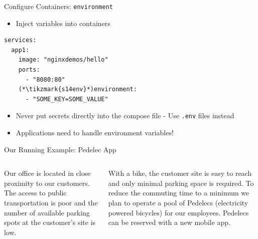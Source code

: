 \begin{frame}[fragile]{Configure Containers: \texttt{environment}}
  \begin{itemize}\item Inject variables into containers\end{itemize}
  \begin{yamlbox}
\begin{lstlisting}[style=wsyamlstyle]
services:
  app1:
    image: "nginxdemos/hello"
    ports:
      - "8080:80"
    (*\tikzmark{s14env}*)environment:
      - "SOME_KEY=SOME_VALUE"
\end{lstlisting}
  \end{yamlbox}
  \begin{itemize}
    \item Never put secrets directly into the compose file - Use \texttt{.env} files instead
    \item Applications need to handle environment variables!
  \end{itemize}
\end{frame}

\begin{frame}{Our Running Example: Pedelec App}
  \begin{columns}[c]
      Our office is located in close proximity to our customers. The access to
      public transportation is poor and the number of available parking spots at
      the customer's site is low.
      \medskip

      With a bike, the customer site is easy to reach and only minimal parking
      space is required. To reduce the commuting time to a minimum we plan to
      operate a pool of Pedelecs (electricity powered bicycles) for our employees.
      Pedelecs can be reserved with a new mobile app.
      \centering{}
  \end{columns}
\end{frame}

